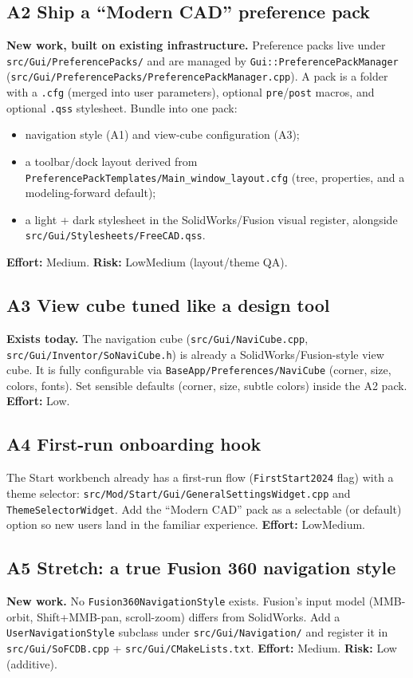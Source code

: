 \documentclass[11pt]{article}
\begin{document}
\subsection{A2 \textemdash{} Ship a ``Modern CAD'' preference pack}
\textbf{New work, built on existing infrastructure.} Preference packs live under
\texttt{src/Gui/PreferencePacks/} and are managed by \texttt{Gui::PreferencePackManager}
(\texttt{src/Gui/PreferencePacks/PreferencePackManager.cpp}). A pack is a folder with a
\texttt{.cfg} (merged into user parameters), optional \texttt{pre}/\texttt{post} macros, and
optional \texttt{.qss} stylesheet. Bundle into one pack:
\begin{itemize}
  \item navigation style (A1) and view-cube configuration (A3);
  \item a toolbar/dock layout derived from \texttt{PreferencePackTemplates/Main\_window\_layout.cfg} (tree, properties, and a modeling-forward default);
  \item a light + dark stylesheet in the SolidWorks/Fusion visual register, alongside \texttt{src/Gui/Stylesheets/FreeCAD.qss}.
\end{itemize}
\textbf{Effort:} Medium. \quad\textbf{Risk:} Low\textendash Medium (layout/theme QA).

\subsection{A3 \textemdash{} View cube tuned like a design tool}
\textbf{Exists today.} The navigation cube (\texttt{src/Gui/NaviCube.cpp},
\texttt{src/Gui/Inventor/SoNaviCube.h}) is already a SolidWorks/Fusion-style view cube.
It is fully configurable via \texttt{BaseApp/Preferences/NaviCube} (corner, size, colors,
fonts). Set sensible defaults (corner, size, subtle colors) inside the A2 pack.
\textbf{Effort:} Low.

\subsection{A4 \textemdash{} First-run onboarding hook}
The Start workbench already has a first-run flow (\texttt{FirstStart2024} flag) with a
theme selector: \texttt{src/Mod/Start/Gui/GeneralSettingsWidget.cpp} and
\texttt{ThemeSelectorWidget}. Add the ``Modern CAD'' pack as a selectable (or default)
option so new users land in the familiar experience.
\textbf{Effort:} Low\textendash Medium.

\subsection{A5 \textemdash{} Stretch: a true Fusion 360 navigation style}
\textbf{New work.} No \texttt{Fusion360NavigationStyle} exists. Fusion's input model
(MMB-orbit, Shift+MMB-pan, scroll-zoom) differs from SolidWorks. Add a
\texttt{UserNavigationStyle} subclass under \texttt{src/Gui/Navigation/} and register it in
\texttt{src/Gui/SoFCDB.cpp} + \texttt{src/Gui/CMakeLists.txt}.
\textbf{Effort:} Medium. \quad\textbf{Risk:} Low (additive).
\end{document}
